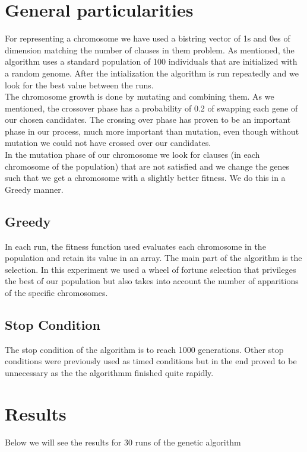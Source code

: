 \documentclass{article}
\begin{document}
\section{General particularities}
For representing a chromosome we have used a bistring vector of 1s and 0es of dimension matching the number of clauses in them problem. As mentioned, the algorithm uses a standard population of 100 individuals that are initialized with a random genome. After the intialization the algorithm is run repeatedly and we look for the best value between the runs.\\

The chromosome growth is done by mutating and combining them. As we mentioned, the crossover phase has a probability of 0.2 of swapping each gene of our chosen candidates. The crossing over phase has proven to be an important phase in our process, much more important than mutation, even though without mutation we could not have crossed over our candidates.\\

In the mutation phase of our chromosome we look for clauses (in each chromosome of the population) that are not satisfied and we change the genes such that we get a chromosome with a slightly better fitness. We do this in a Greedy manner.\\

\subsection{Greedy}

In each run, the fitness function used evaluates each chromosome in the population and retain its value in an array. The main part of the algorithm is the selection. In this experiment we used a wheel of fortune selection that privileges the best of our population but also takes into account the number of apparitions of the specific chromosomes. \\

\subsection{Stop Condition}

The stop condition of the algorithm is to reach 1000 generations. Other stop conditions were previously used as timed conditions but in the end proved to be unnecessary as the the algorithmm finished quite rapidly.\\

\clearpage
\section{Results}
\noindent Below we will see the results for 30 runs of the genetic algorithm \\
\end{document}
